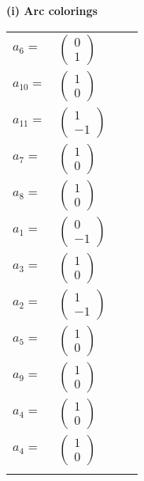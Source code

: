 \documentclass[1p]{elsarticle_modified}
\theoremstyle{definition}
\begin{document}
\flushleft \textbf{(i) Arc colorings}\\
\begin{tabular}{m{7pt} m{180pt} m{7pt} m{180pt} }
\flushright $a_{6}=$&$\begin{pmatrix}0\\1\end{pmatrix}$ \\
\flushright $a_{10}=$&$\begin{pmatrix}1\\0\end{pmatrix}$ \\
\flushright $a_{11}=$&$\begin{pmatrix}1\\-1\end{pmatrix}$ \\
\flushright $a_{7}=$&$\begin{pmatrix}1\\0\end{pmatrix}$ \\
\flushright $a_{8}=$&$\begin{pmatrix}1\\0\end{pmatrix}$ \\
\flushright $a_{1}=$&$\begin{pmatrix}0\\-1\end{pmatrix}$ \\
\flushright $a_{3}=$&$\begin{pmatrix}1\\0\end{pmatrix}$ \\
\flushright $a_{2}=$&$\begin{pmatrix}1\\-1\end{pmatrix}$ \\
\flushright $a_{5}=$&$\begin{pmatrix}1\\0\end{pmatrix}$ \\
\flushright $a_{9}=$&$\begin{pmatrix}1\\0\end{pmatrix}$ \\
\flushright $a_{4}=$&$\begin{pmatrix}1\\0\end{pmatrix}$\\ \flushright $a_{4}=$&$\begin{pmatrix}1\\0\end{pmatrix}$\\&\end{tabular}
\end{document}

